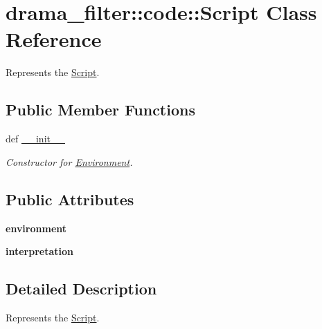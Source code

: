 \hypertarget{classdrama__filter_1_1code_1_1Script}{
\section{drama\_\-filter::code::Script Class Reference}
\label{classdrama__filter_1_1code_1_1Script}
}


Represents the \hyperlink{classdrama__filter_1_1code_1_1Script}{Script}.  


\subsection*{Public Member Functions}
\begin{DoxyCompactItemize}
\item 
def \hyperlink{classdrama__filter_1_1code_1_1Script_a7098d18b0e45eadf12f3b4c2e8bcde77}{\_\-\_\-init\_\-\_\-}
\begin{DoxyCompactList}\small\item\em Constructor for \hyperlink{classdrama__filter_1_1code_1_1Environment}{Environment}. \end{DoxyCompactList}\end{DoxyCompactItemize}
\subsection*{Public Attributes}
\begin{DoxyCompactItemize}
\item 
\hypertarget{classdrama__filter_1_1code_1_1Script_ad8fb2dd82f3790c4271caa57f630b024}{
{\bfseries environment}}
\label{classdrama__filter_1_1code_1_1Script_ad8fb2dd82f3790c4271caa57f630b024}

\item 
\hypertarget{classdrama__filter_1_1code_1_1Script_a09ff3b07f4410bfba12069921e458164}{
{\bfseries interpretation}}
\label{classdrama__filter_1_1code_1_1Script_a09ff3b07f4410bfba12069921e458164}

\end{DoxyCompactItemize}


\subsection{Detailed Description}
Represents the \hyperlink{classdrama__filter_1_1code_1_1Script}{Script}. 

